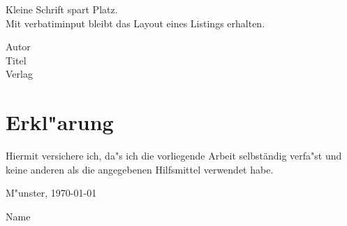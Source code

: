 \documentclass[12pt]{book}
\begin{document}
\begin{tiny}

Kleine Schrift spart Platz.\\

Mit verbatiminput bleibt das Layout eines Listings erhalten.\\



\end{tiny}


\begin{thebibliography}{90}

Autor\\
Titel\\
Verlag\\

\end{thebibliography}


\chapter{Erkl"arung}

\setlength{\parindent}{0mm}
Hiermit versichere ich, da"s ich die vorliegende Arbeit
selbständig verfa"st und keine anderen als die angegebenen
Hilfsmittel verwendet habe.\\

\vspace{20mm}

M"unster, \today\\

\vspace{15mm}

Name\\
\end{document}
